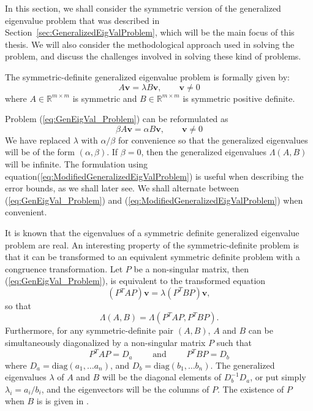 In this section, we shall consider the symmetric version of the generalized eigenvalue problem that was described in Section~\ref{sec:GeneralizedEigValProblem}, which will be the main focus of this thesis. We will also consider the methodological approach used in solving the problem, and discuss the challenges involved in solving these kind of problems.

The symmetric-definite generalized eigenvalue problem is formally given by:
\begin{equation}\label{eq:GenEigVal_Problem}
	A\mathbf{v} = \lambda B\mathbf{v}, \qquad \mathbf{v} \neq 0
\end{equation}
where $A \in \mathbb{R}^{m \times m}$ is symmetric and $B \in \mathbb{R}^{m \times m}$ is symmetric positive definite.

Problem (\ref{eq:GenEigVal_Problem}) can be reformulated  as
\begin{equation}\label{eq:ModifiedGeneralizedEigValProblem}
	\beta A\mathbf{v} = \alpha B\mathbf{v}, \qquad \mathbf{v} \neq 0
\end{equation}
We have replaced $\lambda$ with $\alpha/\beta$ for convenience so that the generalized eigenvalues will be of the form $(\alpha, \beta)$. If $ \beta = 0$, then the generalized eigenvalues $\Lambda(A, B)$ will be infinite. The formulation using equation(\ref{eq:ModifiedGeneralizedEigValProblem}) is useful when describing the error bounds, as we shall later see. We shall alternate between (\ref{eq:GenEigVal_Problem}) and (\ref{eq:ModifiedGeneralizedEigValProblem}) when convenient.

It is known that the eigenvalues of a symmetric definite generalized eigenvalue problem are real. An interesting property of the symmetric-definite problem is that it can be transformed to an equivalent symmetric definite problem with a congruence transformation. Let $P$ be a non-singular matrix, then (\ref{eq:GenEigVal_Problem}), is equivalent to the transformed equation
\begin{equation}\label{eq:CongruenceTransGenEigVal}
	(P{^T}AP) \mathbf{v}= \lambda (P^{T}BP) \mathbf{v},
\end{equation}
so that
\begin{equation}\label{eq:EquivalenceOfEigVals}
	\Lambda(A, B) = \Lambda(P^{T}AP, P^{T}BP).
\end{equation}
Furthermore, for any symmetric-definite pair $(A, B)$, $A$ and $B$ can be simultaneously diagonalized by a non-singular matrix $P$ such that
\begin{equation}\label{eq:SimultaneousDiag}
	P^{T}AP = D_a \qquad \text{ and } \qquad P^TBP = D_b
\end{equation}
where $D_a = \text{diag}(a_1, \ldots a_n) $, and $D_b = \text{diag}(b_1, \ldots b_n) $. The generalized eigenvalues $\lambda$ of $A$ and $B$ will be the diagonal elements of $D^{-1}_bD_a$, or put simply $\lambda_i = a_i/b_i$, and the eigenvectors will be the columns of $P$. The existence of $P$ when $B$ is  is given in \cite[p.~498]{doi:10.1137/1.9781421407944}.

